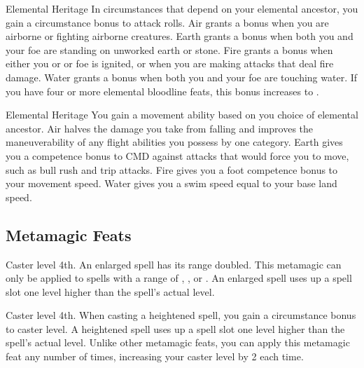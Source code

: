 \featpre Elemental Heritage
\featben In circumstances that depend on your elemental ancestor, you gain a  circumstance bonus to attack rolls. Air grants a bonus when you are airborne or fighting airborne creatures. Earth grants a bonus when both you and your foe are standing on unworked earth or stone. Fire grants a bonus when either you or or foe is ignited, or when you are making attacks that deal fire damage. Water grants a bonus when both you and your foe are touching water. If you have four or more elemental bloodline feats, this bonus increases to .

\featpre Elemental Heritage
\featben You gain a movement ability based on you choice of elemental ancestor. Air halves the damage you take from falling and improves the maneuverability of any flight abilities you possess by one category. Earth gives you a  competence bonus to CMD against attacks that would force you to move, such as bull rush and trip attacks. Fire gives you a  foot competence bonus to your movement speed. Water gives you a swim speed equal to your base land speed.

\subsection{Metamagic Feats}

 Caster level 4th.
 An enlarged spell has its range doubled. This metamagic can only be applied to spells with a range of \rngclose, \rngmed, or \rnglong. An enlarged spell uses up a spell slot one level higher than the spell's actual level.

\begin{comment}
\feat{Extend Spell}{Metamagic}
\parhead{Prerequisite} Caster level 8th.
\parhead{Benefit} An extended spell has its duration increased by one duration category: from Short, to Medium, to Long, to Extreme. This metamagic can only be applied to spells with a duration of \durshort, \durmed, or \durlong. An extended spell uses up a spell slot three levels higher than the spell's actual level.
\end{comment}

 Caster level 4th.
 When casting a heightened spell, you gain a  circumstance bonus to caster level. A heightened spell uses up a spell slot one level higher than the spell's actual level. Unlike other metamagic feats, you can apply this metamagic feat any number of times, increasing your caster level by 2 each time.

